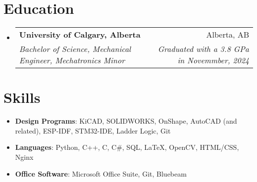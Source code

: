 \documentclass[letterpaper,11pt]{article}
\makeatletter
\newcommand{\resumeItem}[2]{
  \item\small{
    \textbf{#1}{: #2 \vspace{-2pt}}
  }
}
\newcommand{\resumeSubheading}[4]{
  \vspace{-1pt}\item
    \begin{tabular*}{0.97\textwidth}[t]{l@{\extracolsep{\fill}}r}
      \textbf{#1} & #2 \\
      \textit{\small#3} & \textit{\small #4} \\
    \end{tabular*}\vspace{-5pt}
}
\newcommand{\resumeSubSubheading}[2]{
    \begin{tabular*}{0.97\textwidth}{l@{\extracolsep{\fill}}r}
      \textit{\small#1} & \textit{\small #2} \\
    \end{tabular*}\vspace{-5pt}
}
\newcommand{\resumeSubItem}[2]{\resumeItem{#1}{#2}\vspace{-4pt}}
\newcommand{\resumeSubHeadingListStart}{\begin{itemize}[leftmargin=*]}
\newcommand{\resumeSubHeadingListEnd}{\end{itemize}}
\makeatother
\begin{document}
\section{Education}
  \resumeSubHeadingListStart
    \resumeSubheading
      {University of Calgary, Alberta}{Alberta, AB}
      {Bachelor of Science, Mechanical Engineer, Mechatronics Minor}{Graduated with a 3.8 GPa in Novemmber, 2024}
  \resumeSubHeadingListEnd

\section{Skills}
 \resumeSubHeadingListStart
   \resumeSubItem{Design Programs}{KiCAD, SOLIDWORKS, OnShape, AutoCAD (and related), ESP-IDF, STM32-IDE, Ladder Logic, Git}
   \resumeSubItem{Languages}{Python, C++, C, C\#, SQL, \LaTeX, OpenCV, HTML/CSS, Nginx}
   \resumeSubItem{Office Software}{Microsoft Office Suite, Git, Bluebeam}
 \resumeSubHeadingListEnd



\end{document}
